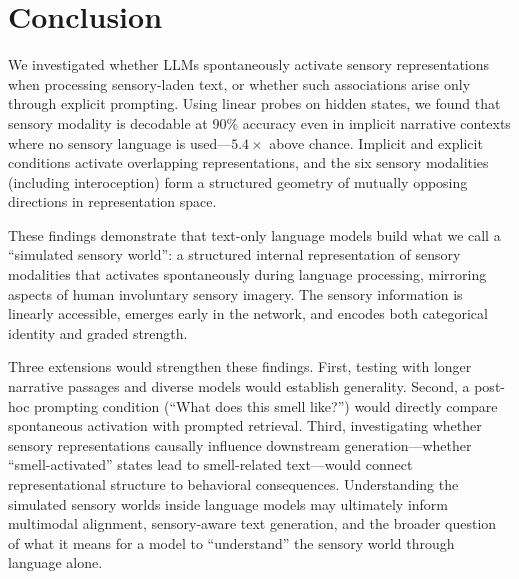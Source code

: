\section{Conclusion}
\label{sec:conclusion}

We investigated whether LLMs spontaneously activate sensory representations when processing sensory-laden text, or whether such associations arise only through explicit prompting. Using linear probes on \qwen hidden states, we found that sensory modality is decodable at 90\% accuracy even in implicit narrative contexts where no sensory language is used---$5.4\times$ above chance. Implicit and explicit conditions activate overlapping representations, and the six sensory modalities (including interoception) form a structured geometry of mutually opposing directions in representation space.

These findings demonstrate that text-only language models build what we call a ``simulated sensory world'': a structured internal representation of sensory modalities that activates spontaneously during language processing, mirroring aspects of human involuntary sensory imagery. The sensory information is linearly accessible, emerges early in the network, and encodes both categorical identity and graded strength.

Three extensions would strengthen these findings. First, testing with longer narrative passages and diverse models would establish generality. Second, a post-hoc prompting condition (``What does this smell like?'') would directly compare spontaneous activation with prompted retrieval. Third, investigating whether sensory representations causally influence downstream generation---whether ``smell-activated'' states lead to smell-related text---would connect representational structure to behavioral consequences. Understanding the simulated sensory worlds inside language models may ultimately inform multimodal alignment, sensory-aware text generation, and the broader question of what it means for a model to ``understand'' the sensory world through language alone.
